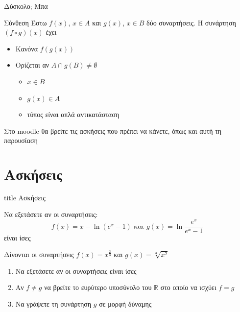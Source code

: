 \documentclass{presentation}
\begin{document}
\begin{frame}{Δύσκολο; Μπα}
  \begin{block}{Σύνθεση}
    Έστω $f(x)$, $x\in Α$ και $g(x)$, $x\in Β$ δύο συναρτήσεις. Η συνάρτηση $(f\circ g)(x)$ έχει
    \begin{itemize}
      \item Κανόνα $f(g(x))$
      \item Ορίζεται αν $Α\cap g(Β)\ne \emptyset$
            \begin{itemize}
              \item<2-> $x\in Β$
              \item<3-> $g(x)\in Α$
              \item<4-> τύπος είναι απλά αντικατάσταση
            \end{itemize}
    \end{itemize}
  \end{block}
\end{frame}



\begin{frame}[noframenumbering]
  Στο moodle θα βρείτε τις ασκήσεις που πρέπει να κάνετε, όπως και αυτή τη παρουσίαση
\end{frame}

\section{Ασκήσεις}

\begin{frame}[noframenumbering]
  \vfill
  \centering
  \begin{beamercolorbox}[sep=8pt,center,shadow=true,rounded=true]{title}
    Ασκήσεις
  \end{beamercolorbox}
  \vfill
\end{frame}

\begin{askisi}
  Να εξετάσετε αν οι συναρτήσεις:
  $$f(x)=x-\ln (e^x-1) \text{ και } g(x)=\ln\frac{e^x}{e^x-1}$$
  είναι ίσες

\end{askisi}

\begin{askisi}
  Δίνονται οι συναρτήσεις $f(x)=x^{\frac{2}{3}}$ και $g(x)=\sqrt[3]{x^2}$
  \begin{enumerate}
    \item<1-> Να εξετάσετε αν οι συναρτήσεις είναι ίσες
    \item<2-> Αν $f\ne g$ να βρείτε το ευρύτερο υποσύνολο του $\mathbb{R}$ στο οποίο να ισχύει $f=g$
    \item<3-> Να γράψετε τη συνάρτηση $g$ σε μορφή δύναμης
  \end{enumerate}

\end{askisi}
\end{document}
